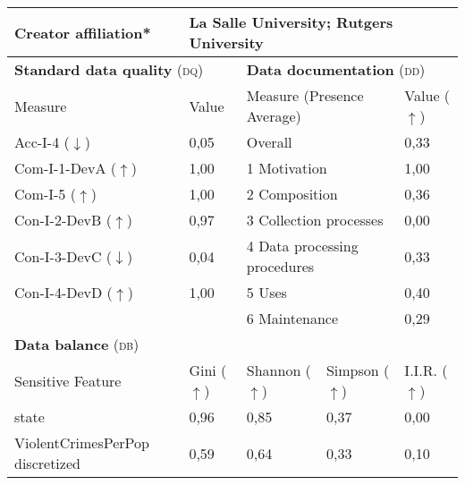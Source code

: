 \begin{table}[h]
\begin{tabular}{|p{3cm}|p{1.9cm}p{3cm}p{2.6cm}p{1.6cm}|}
        \textbf{Creator affiliation*} & \multicolumn{4}{l|}{La Salle University; Rutgers University} \\ \hline\hline
        \multicolumn{2}{|l|}{\textbf{Standard data quality} (\textsc{dq})} & \multicolumn{3}{|l|}{\textbf{Data documentation} (\textsc{dd})}\\ \hline
        Measure & Value & \multicolumn{2}{|l|}{Measure (Presence Average)} & Value ($\uparrow$) \\ \hline
        Acc-I-4 ($\downarrow$) & 0,05\cellcolor[HTML]{FEF9F8} & \multicolumn{2}{|l|}{Overall} & 0,33\cellcolor[HTML]{FDB6A0} \\
        Com-I-1-DevA ($\uparrow$) & 1,00\cellcolor[HTML]{FFFFFF} & \multicolumn{2}{|l|}{1 Motivation} & 1,00\cellcolor[HTML]{FFFFFF} \\
        Com-I-5 ($\uparrow$) & 1,00\cellcolor[HTML]{FFFFFF} & \multicolumn{2}{|l|}{2 Composition} & 0,36\cellcolor[HTML]{FDB8A4} \\
        Con-I-2-DevB ($\uparrow$) & 0,97\cellcolor[HTML]{FEFBFA} & \multicolumn{2}{|l|}{3 Collection processes} & 0,00\cellcolor[HTML]{FC9272} \\
        Con-I-3-DevC ($\downarrow$) & 0,04\cellcolor[HTML]{FEFBF9} & \multicolumn{2}{|l|}{4 Data processing procedures} & 0,33\cellcolor[HTML]{FDB6A0} \\
        Con-I-4-DevD ($\uparrow$) & 1,00\cellcolor[HTML]{FFFFFF} & \multicolumn{2}{|l|}{5 Uses} & 0,40\cellcolor[HTML]{FDBDAA} \\ 
         & & \multicolumn{2}{|l|}{6 Maintenance} & 0,29\cellcolor[HTML]{FCB19A} \\ \hline
        \multicolumn{5}{|l|}{\textbf{Data balance} (\textsc{db})} \\ \hline 
 		Sensitive Feature & Gini ($\uparrow$) & Shannon ($\uparrow$) & Simpson ($\uparrow$) & I.I.R. ($\uparrow$) \\ \hline
        state & 0,96 & 0,85 & 0,37 & 0,00\cellcolor[HTML]{fc8d59} \\
		ViolentCrimesPerPop discretized & 0,59 & 0,64 & 0,33 & 0,10\cellcolor[HTML]{fc8d59} \\
		 \hline
    \end{tabular}
\end{table}